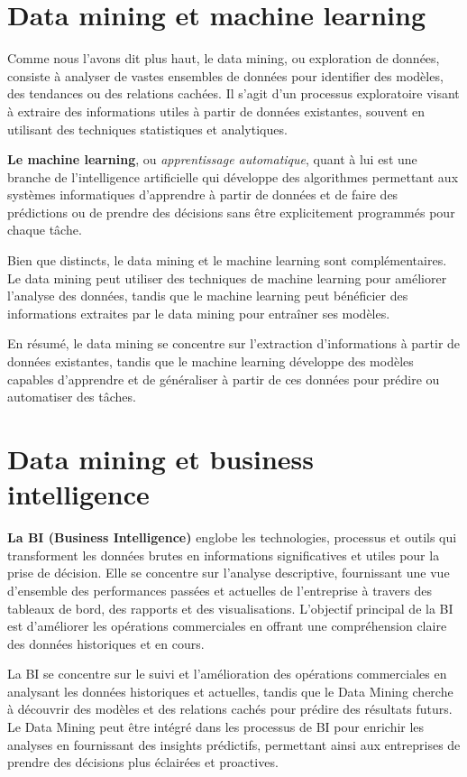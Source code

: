 \documentclass[a4paper,12pt]{report}
\begin{document}
    \section{Data mining et machine learning} 
        Comme nous l'avons dit plus haut, le data mining, ou exploration de données, consiste à analyser de vastes ensembles de données pour identifier des modèles, des tendances ou des relations cachées. Il s'agit d'un processus exploratoire visant à extraire des informations utiles à partir de données existantes, souvent en utilisant des techniques statistiques et analytiques.
        
        \textbf{Le machine learning}, ou \textit{apprentissage automatique}, quant à lui est une branche de l'intelligence artificielle qui développe des algorithmes permettant aux systèmes informatiques d'apprendre à partir de données et de faire des prédictions ou de prendre des décisions sans être explicitement programmés pour chaque tâche.
        
        Bien que distincts, le data mining et le machine learning sont complémentaires. Le data mining peut utiliser des techniques de machine learning pour améliorer l'analyse des données, tandis que le machine learning peut bénéficier des informations extraites par le data mining pour entraîner ses modèles. 
        
        En résumé, le data mining se concentre sur l'extraction d'informations à partir de données existantes, tandis que le machine learning développe des modèles capables d'apprendre et de généraliser à partir de ces données pour prédire ou automatiser des tâches.
        
        
    \section{Data mining et business intelligence} 
        \textbf{La BI (Business Intelligence)} englobe les technologies, processus et outils qui transforment les données brutes en informations significatives et utiles pour la prise de décision. Elle se concentre sur l'analyse descriptive, fournissant une vue d'ensemble des performances passées et actuelles de l'entreprise à travers des tableaux de bord, des rapports et des visualisations. L'objectif principal de la BI est d'améliorer les opérations commerciales en offrant une compréhension claire des données historiques et en cours.
        
        La BI se concentre sur le suivi et l'amélioration des opérations commerciales en analysant les données historiques et actuelles, tandis que le Data Mining cherche à découvrir des modèles et des relations cachés pour prédire des résultats futurs. Le Data Mining peut être intégré dans les processus de BI pour enrichir les analyses en fournissant des insights prédictifs, permettant ainsi aux entreprises de prendre des décisions plus éclairées et proactives.
\newpage
\end{document}

